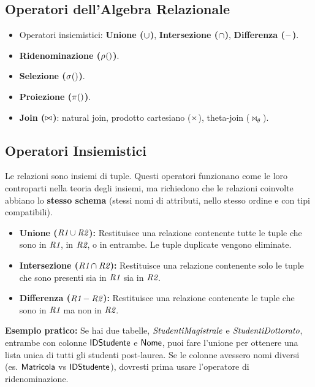 	\subsection{Operatori dell'Algebra Relazionale}
	\begin{itemize}
		\item Operatori insiemistici: \textbf{Unione ($\cup$)}, \textbf{Intersezione ($\cap$)}, \textbf{Differenza ($-$)}.
		\item \textbf{Ridenominazione ($\myrename{}$)}.
		\item \textbf{Selezione ($\sigma_{}()$)}.
		\item \textbf{Proiezione ($\pi_{}()$)}.
		\item \textbf{Join ($\bowtie$)}: natural join, prodotto cartesiano ($\times$), theta-join ($\bowtie_{\theta}$).
	\end{itemize}
	
	\subsection{Operatori Insiemistici}
	Le relazioni sono insiemi di tuple. Questi operatori funzionano come le loro controparti nella teoria degli insiemi, ma richiedono che le relazioni coinvolte abbiano lo \textbf{stesso schema} (stessi nomi di attributi, nello stesso ordine e con tipi compatibili).
	\begin{itemize}
		\item \textbf{Unione ($\textit{R1} \cup \textit{R2}$):} Restituisce una relazione contenente tutte le tuple che sono in $\textit{R1}$, in $\textit{R2}$, o in entrambe. Le tuple duplicate vengono eliminate.
		\item \textbf{Intersezione ($\textit{R1} \cap \textit{R2}$):} Restituisce una relazione contenente solo le tuple che sono presenti sia in $\textit{R1}$ sia in $\textit{R2}$.
		\item \textbf{Differenza ($\textit{R1} - \textit{R2}$):} Restituisce una relazione contenente le tuple che sono in $\textit{R1}$ ma non in $\textit{R2}$.
	\end{itemize}
	\textbf{Esempio pratico:} Se hai due tabelle, $\textit{StudentiMagistrale}$ e $\textit{StudentiDottorato}$, entrambe con colonne $\textsf{IDStudente}$ e $\textsf{Nome}$, puoi fare l'unione per ottenere una lista unica di tutti gli studenti post-laurea. Se le colonne avessero nomi diversi (es. $\textsf{Matricola}$ vs $\textsf{IDStudente}$), dovresti prima usare l'operatore di ridenominazione.
	

